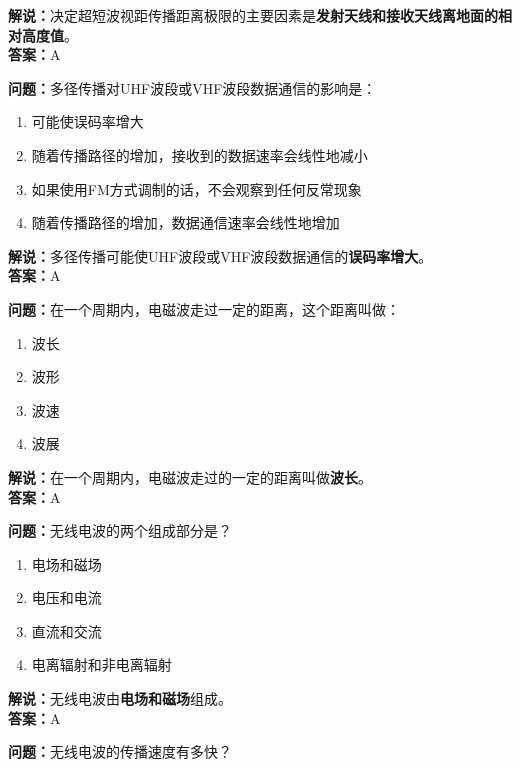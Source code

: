\textbf{解说：}决定超短波视距传播距离极限的主要因素是\textbf{发射天线和接收天线离地面的相对高度值}。\\\textbf{答案：}A%



\textbf{问题：}多径传播对UHF波段或VHF波段数据通信的影响是：

\begin{enumerate}[label=\Alph*), leftmargin=1cm]
	\item 可能使误码率增大
	\item 随着传播路径的增加，接收到的数据速率会线性地减小
	\item 如果使用FM方式调制的话，不会观察到任何反常现象
	\item 随着传播路径的增加，数据通信速率会线性地增加
\end{enumerate}

\textbf{解说：}多径传播可能使UHF波段或VHF波段数据通信的\textbf{误码率增大}。\\\textbf{答案：}A%



\textbf{问题：}在一个周期内，电磁波走过一定的距离，这个距离叫做：

\begin{enumerate}[label=\Alph*), leftmargin=1cm]
	\item 波长
	\item 波形
	\item 波速
	\item 波展
\end{enumerate}

\textbf{解说：}在一个周期内，电磁波走过的一定的距离叫做\textbf{波长}。\\\textbf{答案：}A%



\textbf{问题：}无线电波的两个组成部分是？

\begin{enumerate}[label=\Alph*), leftmargin=1cm]
	\item 电场和磁场
	\item 电压和电流
	\item 直流和交流
	\item 电离辐射和非电离辐射
\end{enumerate}

\textbf{解说：}无线电波由\textbf{电场和磁场}组成。\\\textbf{答案：}A%



\textbf{问题：}无线电波的传播速度有多快？

